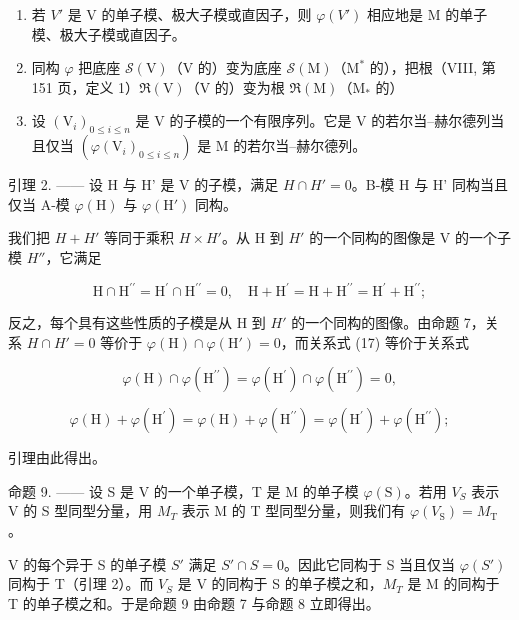 \begin{enumerate}
\def\labelenumi{\alph{enumi})}
\setcounter{enumi}{1}
\item
  若 \(V'\) 是 V 的单子模、极大子模或直因子，则 \(\varphi(V')\) 相应地是 M 的单子模、极大子模或直因子。
\item
  同构 \(\varphi\) 把底座 \(\mathcal{S}(\mathrm{V})\)（\(\mathrm{V}\) 的）变为底座 \(\mathcal{S}(\mathrm{M})\)（\(\mathrm{M}^*\) 的），把根（VIII, 第 151 页，定义 1）\(\Re (\mathrm{V})\)（\(\mathrm{V}\) 的）变为根 \(\Re (\mathrm{M})\)（\(\mathrm{M}_{*}\) 的）
\item
  设 \((\mathrm{V}_{i})_{0\leqslant i\leqslant n}\) 是 V 的子模的一个有限序列。它是 V 的若尔当–赫尔德列当且仅当 \((\varphi(\mathrm{V}_{i})_{0\leqslant i\leqslant n})\) 是 M 的若尔当–赫尔德列。
\end{enumerate}

引理 2. —— 设 H 与 H' 是 V 的子模，满足 \(H \cap H' = 0\)。B-模 H 与 H' 同构当且仅当 A-模 \(\varphi(\mathrm{H})\) 与 \(\varphi(\mathrm{H}')\) 同构。

我们把 \(H+H'\) 等同于乘积 \(H \times H'\)。从 H 到 \(H'\) 的一个同构的图像是 V 的一个子模 \(H''\)，它满足

\[
\mathrm{H} \cap \mathrm{H} ^ {\prime \prime} = \mathrm{H} ^ {\prime} \cap \mathrm{H} ^ {\prime \prime} = 0, \quad \mathrm{H} + \mathrm{H} ^ {\prime} = \mathrm{H} + \mathrm{H} ^ {\prime \prime} = \mathrm{H} ^ {\prime} + \mathrm{H} ^ {\prime \prime};\tag{17}
\]

反之，每个具有这些性质的子模是从 H 到 \(H'\) 的一个同构的图像。由命题 7，关系 \(H \cap H' = 0\) 等价于 \(\varphi(\mathrm{H}) \cap \varphi(\mathrm{H}') = 0\)，而关系式 (17) 等价于关系式

\[
\varphi (\mathrm{H}) \cap \varphi (\mathrm{H} ^ {\prime \prime}) = \varphi (\mathrm{H} ^ {\prime}) \cap \varphi (\mathrm{H} ^ {\prime \prime}) = 0,
\]

\[
\varphi (\mathrm{H}) + \varphi (\mathrm{H} ^ {\prime}) = \varphi (\mathrm{H}) + \varphi (\mathrm{H} ^ {\prime \prime}) = \varphi (\mathrm{H} ^ {\prime}) + \varphi (\mathrm{H} ^ {\prime \prime});
\]

引理由此得出。

命题 9. —— 设 S 是 V 的一个单子模，T 是 M 的单子模 \(\varphi(\mathrm{S})\)。若用 \(V_{S}\) 表示 V 的 S 型同型分量，用 \(M_{T}\) 表示 M 的 T 型同型分量，则我们有 \(\varphi(V_{\mathrm{S}})=M_{\mathrm{T}}\)。

V 的每个异于 S 的单子模 \(S'\) 满足 \(S' \cap S = 0\)。因此它同构于 S 当且仅当 \(\varphi(S')\) 同构于 T（引理 2）。而 \(V_{S}\) 是 V 的同构于 S 的单子模之和，\(M_{T}\) 是 M 的同构于 T 的单子模之和。于是命题 9 由命题 7 与命题 8 立即得出。

